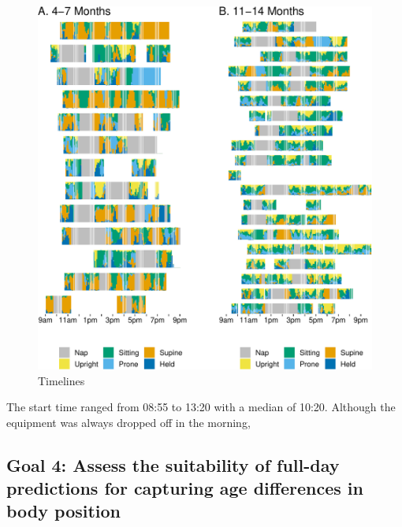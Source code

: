 \documentclass[
  man]{apa6}
\begin{document}
\begin{figure}

{\centering \includegraphics{manuscript_files/figure-latex/timelines-1} 

}

\caption{Timelines}\label{fig:timelines}
\end{figure}

The start time ranged from 08:55 to 13:20 with a median of 10:20. Although the equipment was always dropped off in the morning,

\hypertarget{goal-4-assess-the-suitability-of-full-day-predictions-for-capturing-age-differences-in-body-position}{%
\subsection{Goal 4: Assess the suitability of full-day predictions for capturing age differences in body position}\label{goal-4-assess-the-suitability-of-full-day-predictions-for-capturing-age-differences-in-body-position}}
\end{document}
